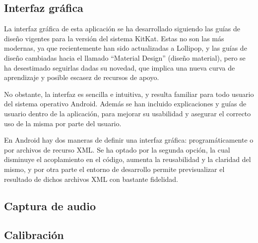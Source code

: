 \subsection{Interfaz gráfica}

La interfaz gráfica de esta aplicación se ha desarrollado siguiendo las guías de diseño vigentes para la versión del sistema KitKat. Estas no son las más modernas, ya que recientemente han sido actualizadas a Lollipop, y las guías de diseño cambiadas hacia el llamado “Material Design” (diseño material), pero se ha desestimado seguirlas dadas su novedad, que implica una nueva curva de aprendizaje y posible escasez de recursos de apoyo.

No obstante, la interfaz es sencilla e intuitiva, y resulta familiar para todo usuario del sistema operativo Android. Además se han incluido explicaciones y guías de usuario dentro de la aplicación, para mejorar su usabilidad y asegurar el correcto uso de la misma por parte del usuario.

En Android hay dos maneras de definir una interfaz gráfica: programáticamente o por archivos de recurso XML. Se ha optado por la segunda opción, la cual disminuye el acoplamiento en el código, aumenta la reusabilidad y la claridad del mismo, y por otra parte el entorno de desarrollo permite previsualizar el resultado de dichos archivos XML con bastante fidelidad.

\subsection{Captura de audio}

\subsection{Calibración}


\chapterend{}